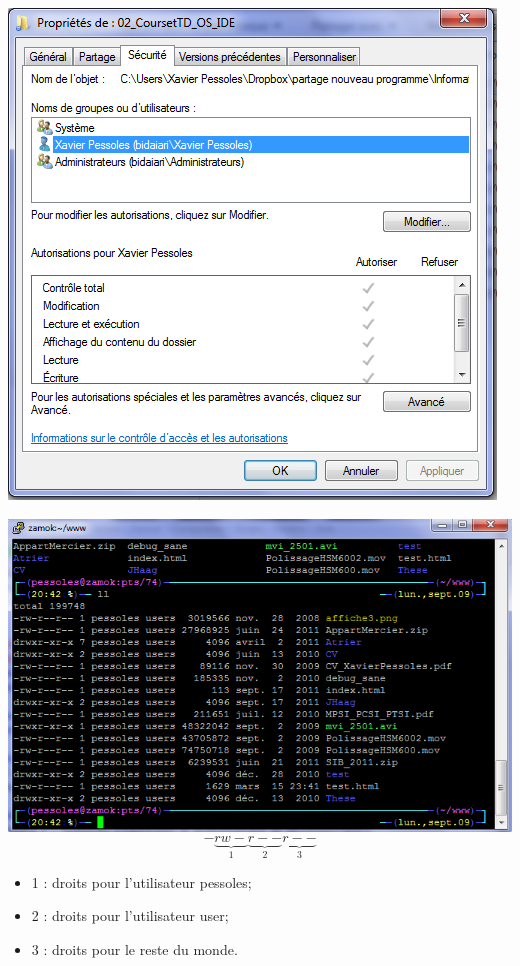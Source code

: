 \documentclass[11pt,oneside]{article}
\begin{document}
\begin{minipage}[c]{.45\linewidth}
\begin{center}
\includegraphics[width=.85\textwidth]{png/droits_win.png}
\end{center}
\end{minipage}\hfill
\begin{minipage}[c]{.45\linewidth}
\begin{center}
\includegraphics[width=.8\textwidth]{png/droits_lin.png}
$$
-\underbrace{rw-}_{1}\underbrace{r--}_{2}\underbrace{r--}_{3}
$$
\begin{itemize}
\item 1 : droits pour l'utilisateur pessoles;
\item 2 : droits pour l'utilisateur user;
\item 3 : droits pour le reste du monde.
\end{itemize}
\end{center}
\end{minipage}
\end{document}
